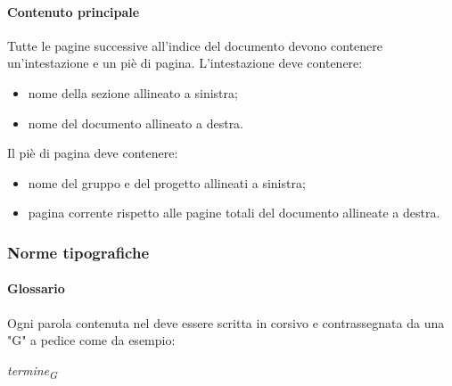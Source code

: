                 \paragraph{Contenuto principale}
                Tutte le pagine successive all'indice del documento devono contenere un'intestazione e un piè di pagina.
                L'intestazione deve contenere:
                \begin{itemize}
                    \item nome della sezione allineato a sinistra;
                    \item nome del documento allineato a destra.
                \end{itemize}
                Il piè di pagina deve contenere:
                \begin{itemize}
                    \item nome del gruppo e del progetto allineati a sinistra;
                    \item pagina corrente rispetto alle pagine totali del documento allineate a destra.
                \end{itemize}
        \subsubsection{Norme tipografiche} \label{sec:normeTipografiche}
                \paragraph{Glossario}
                Ogni parola contenuta nel \gl{} deve essere scritta in corsivo e contrassegnata da una "G" a pedice come da esempio:\\
                \centerline{\textit{termine\textsubscript{G}}}
                
